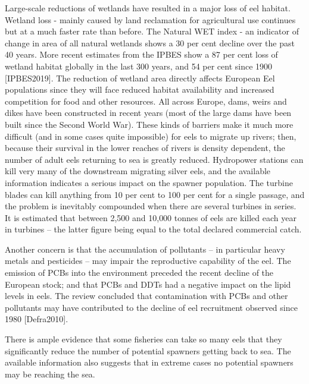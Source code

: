\documentclass[]{article}
\begin{document}
Large-scale reductions of wetlands have resulted in a major loss of eel
habitat. Wetland loss - mainly caused by land reclamation for
agricultural use continues but at a much faster rate than before. The
Natural WET index - an indicator of change in area of all natural
wetlands shows a 30 per cent decline over the past 40 years. More recent
estimates from the IPBES show a 87 per cent loss of wetland habitat
globally in the last 300 years, and 54 per cent since 1900
{[}IPBES2019{]}. The reduction of wetland area directly affects European
Eel populations since they will face reduced habitat availability and
increased competition for food and other resources. All across Europe,
dams, weirs and dikes have been constructed in recent years (most of the
large dams have been built since the Second World War). These kinds of
barriers make it much more difficult (and in some cases quite
impossible) for eels to migrate up rivers; then, because their survival
in the lower reaches of rivers is density dependent, the number of adult
eels returning to sea is greatly reduced. Hydropower stations can kill
very many of the downstream migrating silver eels, and the available
information indicates a serious impact on the spawner population. The
turbine blades can kill anything from 10 per cent to 100 per cent for a
single passage, and the problem is inevitably compounded when there are
several turbines in series. It is estimated that between 2,500 and
10,000 tonnes of eels are killed each year in turbines -- the latter
figure being equal to the total declared commercial catch.

Another concern is that the accumulation of pollutants -- in particular
heavy metals and pesticides -- may impair the reproductive capability of
the eel. The emission of PCBs into the environment preceded the recent
decline of the European stock; and that PCBs and DDTs had a negative
impact on the lipid levels in eels. The review concluded that
contamination with PCBs and other pollutants may have contributed to the
decline of eel recruitment observed since 1980 {[}Defra2010{]}.

There is ample evidence that some fisheries can take so many eels that
they significantly reduce the number of potential spawners getting back
to sea. The available information also suggests that in extreme cases no
potential spawners may be reaching the sea.
\end{document}
